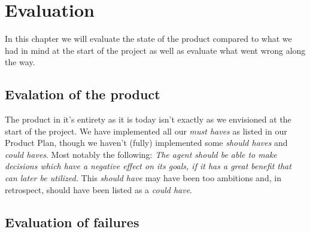 \chapter{Evaluation}
In this chapter we will evaluate the state of the product compared to what we had in mind at the start of the project as well as evaluate what went wrong along the way.

\section{Evalation of the product}
The product in it's entirety as it is today isn't exactly as we envisioned at the start of the project. We have implemented all our \emph{must haves} as listed in our Product Plan, though we haven't (fully) implemented some \emph{should haves} and \emph{could haves}. Most notably the following: \emph{The agent should be able to make decisions which have a negative effect on its goals, if it has a great benefit that can later be utilized.} This \emph{should have} may have been too ambitions and, in retrospect, should have been listed as a \emph{could have}.

\section{Evaluation of failures}